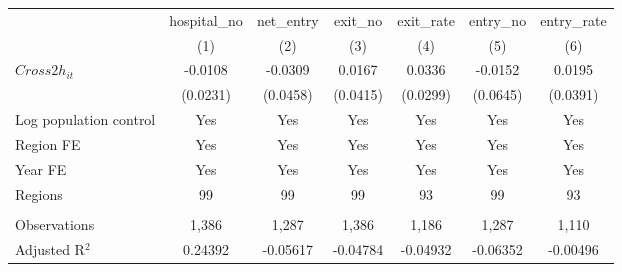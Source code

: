 \begingroup
\centering
\begin{tabular}{lcccccc}
   \toprule
                          & hospital\_no  & net\_entry  & exit\_no  & exit\_rate  & entry\_no  & entry\_rate \\    
                          & (1)           & (2)         & (3)       & (4)         & (5)        & (6)\\  
   \midrule 
   $Cross2h_{it}$         & -0.0108       & -0.0309     & 0.0167    & 0.0336      & -0.0152    & 0.0195\\   
                          & (0.0231)      & (0.0458)    & (0.0415)  & (0.0299)    & (0.0645)   & (0.0391)\\   
   Log population control & Yes           & Yes         & Yes       & Yes         & Yes        & Yes\\  
   Region FE              & Yes           & Yes         & Yes       & Yes         & Yes        & Yes\\  
   Year FE                & Yes           & Yes         & Yes       & Yes         & Yes        & Yes\\  
   Regions                & 99            & 99          & 99        & 93          & 99         & 93\\  
    \\
   Observations           & 1,386         & 1,287       & 1,386     & 1,186       & 1,287      & 1,110\\  
   Adjusted R$^2$         & 0.24392       & -0.05617    & -0.04784  & -0.04932    & -0.06352   & -0.00496\\  
   \bottomrule
\end{tabular}
\par\endgroup
